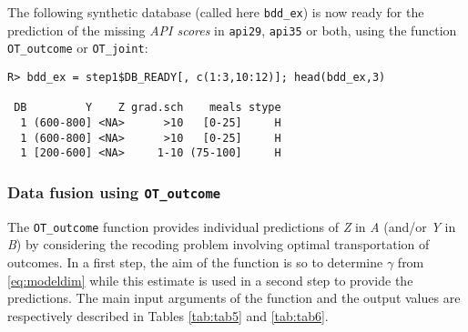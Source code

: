 The following synthetic database (called here \texttt{bdd\_ex}) is now ready for the prediction of the missing \emph{API
scores} in \texttt{api29}, \texttt{api35} or both, using the function \texttt{OT\_outcome} or \texttt{OT\_joint}:

\begin{verbatim}
R> bdd_ex = step1$DB_READY[, c(1:3,10:12)]; head(bdd_ex,3)

 DB         Y    Z grad.sch    meals stype
  1 (600-800] <NA>      >10   [0-25]     H
  1 (600-800] <NA>      >10   [0-25]     H
  1 [200-600] <NA>     1-10 (75-100]     H
\end{verbatim}

\hypertarget{data-fusion-using-ot_outcome}{%
\subsubsection{\texorpdfstring{Data fusion using \texttt{OT\_outcome}}{Data fusion using OT\_outcome}}\label{data-fusion-using-ot_outcome}}

The \texttt{OT\_outcome} function provides individual predictions of \emph{Z} in \emph{A} (and/or \emph{Y} in \emph{B}) by considering the recoding problem involving optimal transportation of outcomes. In a first step, the aim of the function is so to determine \(\gamma\) from \eqref{eq:modeldim} while this estimate is used in a second step to provide the predictions. The main input arguments of the function and the output values are respectively described in Tables \ref{tab:tab5} and \ref{tab:tab6}.

